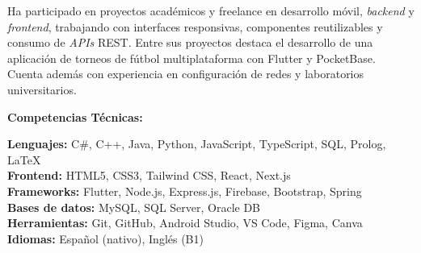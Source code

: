 Ha participado en proyectos académicos y freelance en desarrollo móvil, \textit{backend} y
\textit{frontend}, trabajando con interfaces responsivas, componentes reutilizables y consumo
de \textit{APIs} REST. Entre sus proyectos destaca el desarrollo de una aplicación de torneos
de fútbol multiplataforma con Flutter y PocketBase. Cuenta además con experiencia en
configuración de redes y laboratorios universitarios.

\vspace{0.4cm}

\noindent\textbf{Competencias Técnicas:}

\vspace{0.2cm}

\noindent
\textbf{Lenguajes:} C\#, C++, Java, Python, JavaScript, TypeScript, SQL, Prolog, \LaTeX{} \\
\textbf{Frontend:} HTML5, CSS3, Tailwind CSS, React, Next.js \\
\textbf{Frameworks:} Flutter, Node.js, Express.js, Firebase, Bootstrap, Spring \\
\textbf{Bases de datos:} MySQL, SQL Server, Oracle DB \\
\textbf{Herramientas:} Git, GitHub, Android Studio, VS Code, Figma, Canva \\
\textbf{Idiomas:} Español (nativo), Inglés (B1)

\MediaOptionLogic

